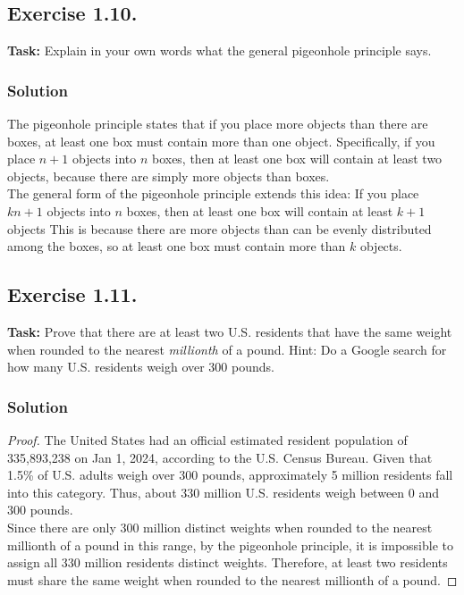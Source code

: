 \documentclass{article}
\begin{document}
\newpage

\subsection{Exercise 1.10.}
\textbf{Task:} Explain in your own words what the general pigeonhole principle says. 

\subsubsection*{Solution}

The pigeonhole principle states that if you place more objects than there are boxes, at least one box must contain more than one object. Specifically, if you place $n+1$ objects into $n$ boxes, then at least one box will contain at least two objects, because there are simply more objects than boxes. \\
The general form of the pigeonhole principle extends this idea: If you place $kn+1$ objects into $n$ boxes, then at least one box will contain at least $k+1$ objects This is because there are more objects than can be evenly distributed among the boxes, so at least one box must contain more than $k$ objects.

\subsection{Exercise 1.11.}
\textbf{Task:} Prove that there are at least two U.S. residents that have the same weight when rounded to the nearest \textit{millionth} of a pound. Hint: Do a Google search for how many U.S. residents weigh over 300 pounds.

\subsubsection*{Solution}

\begin{proof}
The United States had an official estimated resident population of \\335,893,238 on Jan 1, 2024, according to the U.S. Census Bureau. Given that 1.5\% of U.S. adults weigh over 300 pounds, approximately 5 million residents fall into this category. Thus, about 330 million U.S. residents weigh between 0 and 300 pounds. \\
Since there are only 300 million distinct weights when rounded to the nearest millionth of a pound in this range, by the pigeonhole principle, it is impossible to assign all 330 million residents distinct weights. Therefore, at least two residents must share the same weight when rounded to the nearest millionth of a pound. 
\end{proof}
\end{document}
